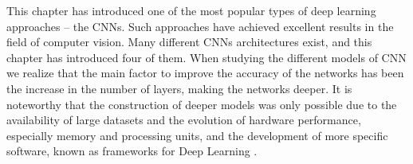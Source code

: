 This chapter has introduced one of the most popular types of deep learning approaches -- the CNNs. Such approaches have achieved excellent results in the field of computer vision. Many different CNNs architectures exist, and this chapter has introduced four of them. When studying the different models of CNN we realize that the main factor to improve the accuracy of the networks has been the increase in the number of layers, making the networks deeper. It is noteworthy that the construction of deeper models was only possible due to the availability of large datasets and the evolution of hardware performance, especially memory and processing units, and the development of more specific software, known as frameworks for Deep Learning  \cite{zhang2020dive}. 



